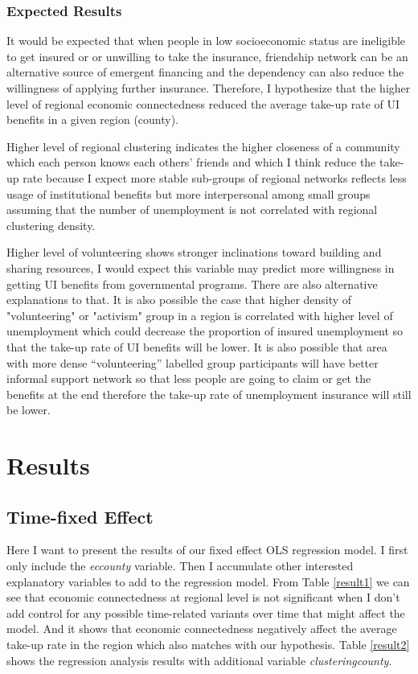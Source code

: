 \documentclass{article}
\begin{document}
\subsubsection{Expected Results}
It would be expected that when people in low socioeconomic status are ineligible to get insured or or unwilling to take the insurance, friendship network can be an alternative source of emergent financing and the dependency can also reduce the willingness of applying further insurance. Therefore, I hypothesize that the higher level of regional economic connectedness reduced the average take-up rate of UI benefits in a given region (county).

Higher level of regional clustering indicates the higher closeness of a community which each person knows each others' friends and which I think reduce the take-up rate because I expect more stable sub-groups of regional networks reflects less usage of institutional benefits but more interpersonal among small groups assuming that the number of unemployment is not correlated with regional clustering density.

Higher level of volunteering shows stronger inclinations toward building and sharing resources, I would expect this variable may predict more willingness in getting UI benefits from governmental programs. There are also alternative explanations to that. It is also possible the case that higher density of "volunteering" or "activism" group in a region is correlated with higher level of unemployment which could decrease the proportion of insured unemployment so that the take-up rate of UI benefits will be lower. It is also possible that area with more dense ``volunteering'' labelled group participants will have better informal support network so that less people are going to claim or get the benefits at the end therefore the take-up rate of unemployment insurance will still be lower. 

\section{Results}
\subsection{Time-fixed Effect}
Here I want to present the results of our fixed effect OLS regression model. I first only include the \textit{ec\textunderscore county} variable. Then I accumulate other interested explanatory variables to add to the regression model. From Table \ref{result1} we can see that economic connectedness at regional level is not significant when I don't add control for any possible time-related variants over time that might affect the model. And it shows that economic connectedness negatively affect the average take-up rate in the region which also matches with our hypothesis.  Table \ref{result2} shows the regression analysis results with additional variable \textit{clustering\textunderscore county}. 
\end{document}
